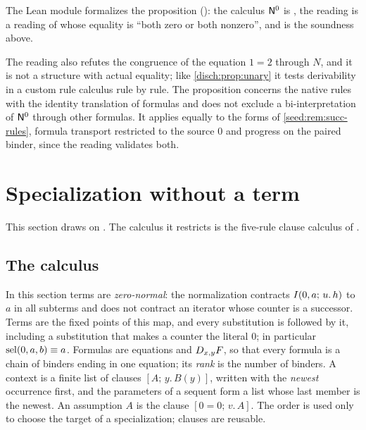 The Lean module  formalizes the proposition
(): the calculus $\mathsf{N}^{0}$ is , the
reading is a reading  of  whose equality is
``both zero or both nonzero'', and  is the soundness above.

The reading also refutes the congruence of the equation $1=2$ through $N$,
and it is not a structure with actual equality; like
\cref{disch:prop:unary} it tests derivability in a custom rule calculus
rule by rule. The proposition concerns the native rules with the identity
translation of formulas and does not exclude a bi-interpretation of
$\mathsf{N}^{0}$ through other formulas. It applies equally to the forms of
\cref{seed:rem:succ-rules}, formula transport restricted to the source $0$
and progress on the paired binder, since the reading validates both.

\section{Specialization without a term}
\label{disch:sec:spec}

This section draws on . The calculus it
restricts is the five-rule clause calculus of .

\subsection{The calculus}

In this section terms are \emph{zero-normal}: the normalization contracts
$I(0,a;\,u.\,h)$ to $a$ in all subterms and does not contract an iterator
whose counter is a successor. Terms are the fixed points of this map, and
every substitution is followed by it, including a substitution that makes
a counter the literal $0$; in particular $\operatorname{sel}(0,a,b)\equiv a$. Formulas
are equations and $D_{x,y}F$, so that every formula is a chain of binders
ending in one equation; its \emph{rank} is the number of binders. A
context is a finite list of clauses $[A;\,y.\,B(y)]$, written with the
\emph{newest} occurrence first, and the parameters of a sequent form a
list whose last member is the newest. An assumption $A$ is the clause
$[0=0;\,v.\,A]$. The order is used only to choose the target of a
specialization; clauses are reusable.

